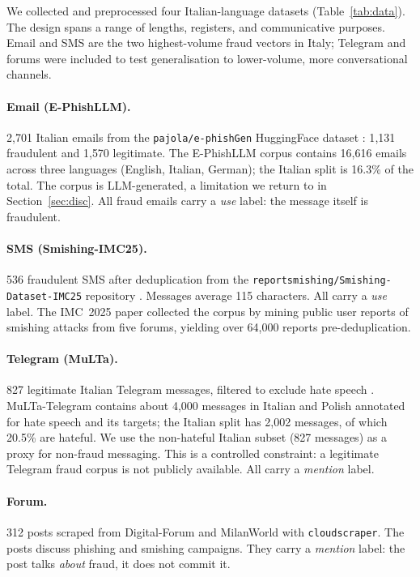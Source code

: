 \documentclass[preprint,12pt,authoryear]{elsarticle}
\begin{document}
We collected and preprocessed four Italian-language datasets
(Table~\ref{tab:data}). The design spans a range of lengths,
registers, and communicative purposes. Email and SMS are the two
highest-volume fraud vectors in Italy; Telegram and forums were
included to test generalisation to lower-volume, more conversational
channels.

\paragraph*{Email (E-PhishLLM).} 2{,}701 Italian emails from the
\texttt{pajola/e-phishGen} HuggingFace dataset
\citep{pajola2025ephishgen}: 1{,}131 fraudulent and 1{,}570
legitimate. The E-PhishLLM corpus contains 16{,}616 emails across
three languages (English, Italian, German); the Italian split is
16.3\% of the total. The corpus is LLM-generated, a limitation we
return to in Section~\ref{sec:disc}. All fraud emails carry a
\emph{use} label: the message itself is fraudulent.

\paragraph*{SMS (Smishing-IMC25).} 536 fraudulent SMS after
deduplication from the \texttt{reportsmishing/Smishing-Dataset-IMC25}
repository \citep{agarwal2025smishing}. Messages average 115
characters. All carry a \emph{use} label. The IMC~2025 paper
collected the corpus by mining public user reports of smishing
attacks from five forums, yielding over 64{,}000 reports
pre-deduplication.

\paragraph*{Telegram (MuLTa).} 827 legitimate Italian Telegram
messages, filtered to exclude hate speech
\citep{leonardelli2025multa}. MuLTa-Telegram contains about 4{,}000
messages in Italian and Polish annotated for hate speech and its
targets; the Italian split has 2{,}002 messages, of which 20.5\%
are hateful. We use the non-hateful Italian subset (827 messages) as
a proxy for non-fraud messaging. This is a controlled constraint: a
legitimate Telegram fraud corpus is not publicly available. All
carry a \emph{mention} label.

\paragraph*{Forum.} 312 posts scraped from Digital-Forum and
MilanWorld with \texttt{cloudscraper}. The posts discuss phishing and
smishing campaigns. They carry a \emph{mention} label: the post talks
\emph{about} fraud, it does not commit it.
\end{document}
